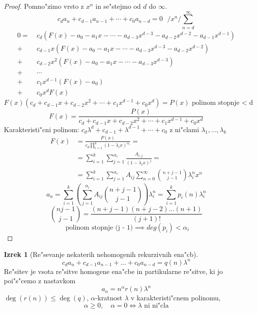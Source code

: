 \documentclass[a4paper,12pt]{article}
\theoremstyle{definition}
\newtheorem{theorem}[counter]{Izrek}
\theoremstyle{remark}
\begin{document}
\begin{proof}
	Pomno"zimo vrsto z $x^n$ in se"stejmo od $d$ do $\infty$.
    \[c_d a_n + c_{d - 1} a_{n - 1} + \cdots + c_0 a_{n - d} = 0 \ \ \ / x^n / \sum_{n = d}^{\infty}\]
    \begin{align*}
        0 = \ & c_d(F(x) - a_0 - a_1x - \cdots - a_{d - 3}x^{d - 3} - a_{d - 2}x^{d - 2} - a_{d - 1}x^{d - 1})\\
        +\ & c_{d - 1} x (F(x) - a_0 - a_1x - \cdots - a_{d - 3}x^{d - 3} - a_{d - 2}x^{d - 2})\\
        +\ & c_{d - 2} x^2 (F(x) - a_0 - a_1x - \cdots - a_{d - 3}x^{d - 3})\\
        +\ & \cdots \\
        +\ & c_1 x^{d - 1} (F(x) - a_0) \\
        +\ & c_0 x^d F(x)
    \end{align*}
    \[F(x) (c_d + c_{d - 1} x + c_{d - 2} x^2 + \cdots + c_1 x^{d - 1} + c_0 x^d) = P(x) \text{ polinom stopnje < d}\]
    \[F(x) = \frac{P(x)}{c_d + c_{d - 1} x + c_{d - 2} x^2 + \cdots + c_1 x^{d - 1} + c_0 x^d}\]
    Karakteristi"cni polinom: $c_d \lambda^d + c_{d - 1} + \lambda^{d - 1} + \cdots + c_0$ z ni"clami $\lambda_1, \ldots, \lambda_k$
    \begin{align*}
        F(x) & = \frac{P(x)}{c_d \prod_{i = 1}^k (1 - \lambda_i x)^{\alpha_i}} = \\
        & = \sum_{i = 1}^k \sum_{j = 1}^{\alpha_i} \frac{A_{i, j}}{(1 - \lambda_i x)^j} = \\
        & = \sum_{i = 1}^k \sum_{j = 1}^{\alpha_i} A_{i j} \sum_{n = 0}^{\infty} \binom{n + j - 1}{j - 1} \lambda_i^n x^n
    \end{align*}
    \[a_n = \sum_{i = 1}^k (\sum_{j = 1}^{\alpha_i} A_{i j} \binom{n + j - 1}{j - 1})\lambda_i^n = \sum_{i = 1}^k p_i(n)\lambda_i^n\]
    \[\binom{n  j - 1}{j - 1} = \frac{(n + j - 1)(n + j - 2) ... (n + 1)}{(j + 1)!}\]
    \[\text{ polinom stopnje (j - 1)} \implies deg(p_i) < \alpha_i\]
\end{proof}

\begin{theorem}[Re"sevanje nekaterih nehomogenih rekurzivnih ena"cb]
    \[c_d a_n + c_{d - 1} a_{n - 1} + ... + c_0 a_{n - d} = q(n) \lambda^n\]
    Re"sitev je vsota re"sitve homogene ena"cbe in partikularne re"sitve, ki jo poi"s"cemo z nastavkom
    \[a_n = n^{\alpha} r(n) \lambda^n\]
    $\deg(r(n)) \leqslant \deg(q)$, $\alpha$-kratnost $\lambda$ v karakteristi"cnem polinomu,
    \[\alpha \geqslant 0, \quad \alpha = 0 \iff \lambda \text{ ni ni"cla}\]
\end{theorem}
\end{document}
